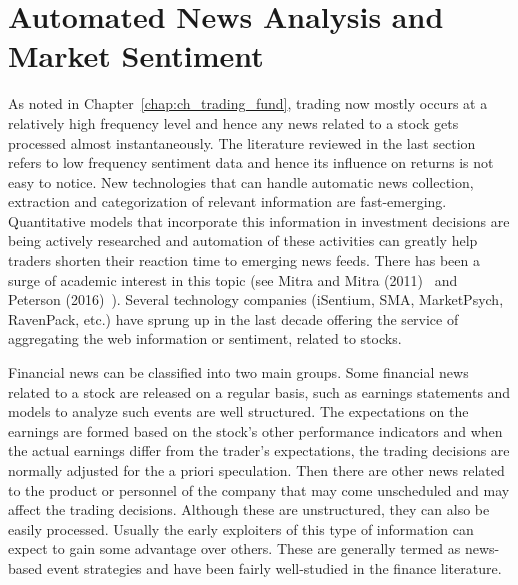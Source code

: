 \section{Automated News Analysis and Market Sentiment}


As noted in Chapter~\ref{chap:ch_trading_fund}, trading now mostly occurs at a relatively high frequency level and hence any news related to a stock gets processed almost instantaneously. The literature reviewed in the last section refers to low frequency sentiment data and hence its influence on returns is not easy to notice. New technologies that can handle automatic news collection, extraction and categorization of relevant information are fast-emerging. Quantitative models that incorporate this information in investment decisions are being actively researched and automation of these activities can greatly help traders shorten their reaction time to emerging news feeds. There has been a surge of academic interest in this topic (see Mitra and Mitra (2011)~\cite{mitra2} and Peterson (2016)~\cite{peterson}). Several technology companies (iSentium, SMA, MarketPsych, RavenPack, etc.) have sprung up in the last decade offering the service of aggregating the web information or sentiment, related to stocks. 


Financial news can be classified into two main groups. Some financial news related to a stock are released on a regular basis, such as earnings statements and models to analyze such events are well structured. The expectations on the earnings are formed based on the stock's other performance indicators and when the actual earnings differ from the trader's expectations, the trading decisions are normally adjusted for the a priori speculation. Then there are other news related to the product or personnel of the company that may come unscheduled and may affect the trading decisions. Although these are unstructured, they can also be easily processed. Usually the early exploiters of this type of information can expect to gain some advantage over others. These are generally termed as news-based event strategies and have been fairly well-studied in the finance literature. 


